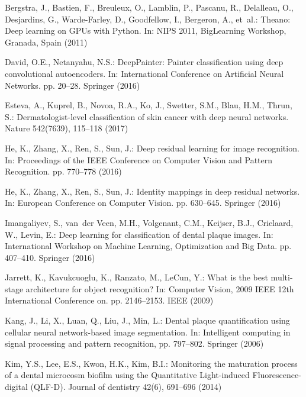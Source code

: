 \documentclass[runningheads,a4paper]{llncs}
\begin{document}
\begin{thebibliography}{10}
\providecommand{\url}[1]{\texttt{#1}}
\providecommand{\urlprefix}{URL }

Bergstra, J., Bastien, F., Breuleux, O., Lamblin, P., Pascanu, R., Delalleau,
  O., Desjardins, G., Warde-Farley, D., Goodfellow, I., Bergeron, A., et~al.:
  Theano: Deep learning on {GPU}s with {P}ython. In: NIPS 2011, BigLearning
  Workshop, Granada, Spain (2011)

David, O.E., Netanyahu, N.S.: Deep{P}ainter: Painter classification using deep
  convolutional autoencoders. In: International Conference on Artificial Neural
  Networks. pp. 20--28. Springer (2016)

Esteva, A., Kuprel, B., Novoa, R.A., Ko, J., Swetter, S.M., Blau, H.M., Thrun,
  S.: Dermatologist-level classification of skin cancer with deep neural
  networks. Nature  542(7639),  115--118 (2017)

He, K., Zhang, X., Ren, S., Sun, J.: Deep residual learning for image
  recognition. In: Proceedings of the IEEE Conference on Computer Vision and
  Pattern Recognition. pp. 770--778 (2016)

He, K., Zhang, X., Ren, S., Sun, J.: Identity mappings in deep residual
  networks. In: European Conference on Computer Vision. pp. 630--645. Springer
  (2016)

Imangaliyev, S., van~der Veen, M.H., Volgenant, C.M., Keijser, B.J., Crielaard,
  W., Levin, E.: Deep learning for classification of dental plaque images. In:
  International Workshop on Machine Learning, Optimization and Big Data. pp.
  407--410. Springer (2016)

Jarrett, K., Kavukcuoglu, K., Ranzato, M., LeCun, Y.: What is the best
  multi-stage architecture for object recognition? In: Computer Vision, 2009
  IEEE 12th International Conference on. pp. 2146--2153. IEEE (2009)

Kang, J., Li, X., Luan, Q., Liu, J., Min, L.: Dental plaque quantification
  using cellular neural network-based image segmentation. In: Intelligent
  computing in signal processing and pattern recognition, pp. 797--802.
  Springer (2006)

Kim, Y.S., Lee, E.S., Kwon, H.K., Kim, B.I.: Monitoring the maturation process
  of a dental microcosm biofilm using the {Q}uantitative {L}ight-induced
  {F}luorescence-digital {(QLF-D)}. Journal of dentistry  42(6),  691--696
  (2014)


\end{thebibliography}
\end{document}
